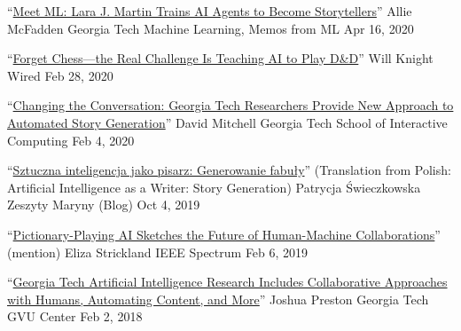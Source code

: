  \cvmedia
    {``\href{https://mlatgt.blog/2020/04/16/meet-mlgt-lara-j-martin-trains-ai-agents-to-become-storytellers/}{Meet ML\@GT: Lara J. Martin Trains AI Agents to Become Storytellers}''} %
    {Allie McFadden} %
    {Georgia Tech Machine Learning, Memos from ML\@GT} %
    {Apr 16, 2020} %

  \cvmedia
    {``\href{https://www.wired.com/story/forget-chess-real-challenge-teaching-ai-play-dandd/}{Forget Chess---the Real Challenge Is Teaching AI to Play D\&D}''} %
    {Will Knight} %
    {Wired} %
    {Feb 28, 2020} %

  \cvmedia
    {``\href{https://www.ic.gatech.edu/news/632082/changing-conversation-georgia-tech-researchers-provide-new-approach-automated-story}{Changing the Conversation: Georgia Tech Researchers Provide New Approach to Automated Story Generation}''} %
    {David Mitchell} %
    {Georgia Tech School of Interactive Computing} %
    {Feb 4, 2020} %

  \cvmedia
    {``\href{https://zeszytymaryny.pl/naukowo/sztuczna-inteligencja-jako-pisarz-generowanie-fabuly/}{Sztuczna inteligencja jako pisarz: Generowanie fabuły}'' \newline (Translation from Polish: Artificial Intelligence as a Writer: Story Generation)} %
    {Patrycja Świeczkowska} %
    {Zeszyty Maryny (Blog)} %
    {Oct 4, 2019} %


  \cvmedia
    {``\href{https://spectrum.ieee.org/tech-talk/robotics/artificial-intelligence/pictionary-playing-ai-sketches-the-future-of-human-machine-collaborations}{Pictionary-Playing AI Sketches the Future of Human-Machine Collaborations}'' (mention)} %
    {Eliza Strickland} %
    {IEEE Spectrum} %
    {Feb 6, 2019} %


  \cvmedia
    {``\href{https://gvu.gatech.edu/georgia-tech-aaai2018}{Georgia Tech Artificial Intelligence Research Includes Collaborative Approaches with Humans, Automating Content, and More}''} %
    {Joshua Preston} %
    {Georgia Tech GVU Center} %
    {Feb 2, 2018} %




